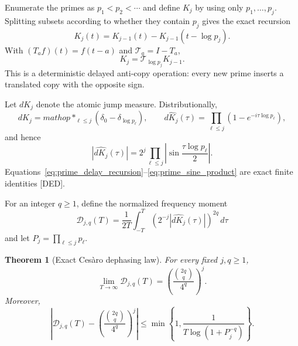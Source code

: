 \documentclass[11pt]{amsart}
\numberwithin{equation}{section}
\theoremstyle{plain}
\newtheorem{theorem}{Theorem}[section]
\theoremstyle{definition}
\theoremstyle{remark}
\begin{document}
Enumerate the primes as $p_1<p_2<\cdots$ and define $K_j$ by using only
$p_1,\ldots,p_j$.  Splitting subsets according to whether they contain $p_j$
gives the exact recursion
\begin{equation}
K_j(t)=K_{j-1}(t)-K_{j-1}(t-\log p_j).
\label{eq:prime_delay_recursion}
\end{equation}
With $(T_af)(t)=f(t-a)$ and $\mathcal T_a=I-T_a$,
\begin{equation}
K_j=\mathcal T_{\log p_j}K_{j-1}.
\label{eq:prime_transfer_operator}
\end{equation}
This is a deterministic delayed anti-copy operation: every new prime inserts
a translated copy with the opposite sign.

Let $dK_j$ denote the atomic jump measure.  Distributionally,
\begin{equation}
dK_j=mathop{\ast}_{\ell\leq j}
  (\delta_0-\delta_{\log p_\ell}),
\qquad
\widehat{dK_j}(\tau)=
\prod_{\ell\leq j}(1-e^{-i\tau\log p_\ell}),
\label{eq:prime_interference_product}
\end{equation}
and hence
\begin{equation}
|\widehat{dK_j}(\tau)|
=2^j\prod_{\ell\leq j}
\left|\sin\frac{\tau\log p_\ell}{2}\right|.
\label{eq:prime_sine_product}
\end{equation}
Equations~\eqref{eq:prime_delay_recursion}--\eqref{eq:prime_sine_product}
are exact finite identities \textnormal{[DED]}.

For an integer $q\geq1$, define the normalized frequency moment
\begin{equation}
\mathcal D_{j,q}(T)=\frac1{2T}\int_{-T}^{T}
\left(2^{-j}|\widehat{dK_j}(\tau)|\right)^{2q}\,d\tau
\end{equation}
and let $P_j=\prod_{\ell\leq j}p_\ell$.

\begin{theorem}[Exact Ces\`aro dephasing law]
\label{thm:exact_tau_dephasing}
For every fixed $j,q\geq1$,
\begin{equation}
\lim_{T\to\infty}\mathcal D_{j,q}(T)
=\left(\frac{\binom{2q}{q}}{4^q}\right)^j.
\label{eq:exact_tau_limit}
\end{equation}
Moreover,
\begin{equation}
\left|\mathcal D_{j,q}(T)-
\left(\frac{\binom{2q}{q}}{4^q}\right)^j\right|
\leq
\min\!\left\{1,
\frac{1}{T\log(1+P_j^{-q})}\right\}.
\label{eq:finite_tau_error}
\end{equation}
\end{theorem}
\end{document}
